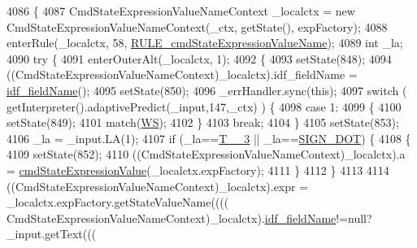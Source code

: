 \begin{DoxyCode}
4086                                                                                                            
                                   \{
4087     CmdStateExpressionValueNameContext \_localctx = \textcolor{keyword}{new} CmdStateExpressionValueNameContext(\_ctx, getState(),
       expFactory);
4088     enterRule(\_localctx, 58, \hyperlink{classgov_1_1nasa_1_1jpf_1_1inspector_1_1server_1_1expression_1_1parser_1_1_expression_grammar_parser_aa79865a7fa8f7e73f52ecb9ea357a1a4}{RULE\_cmdStateExpressionValueName});
4089     \textcolor{keywordtype}{int} \_la;
4090     \textcolor{keywordflow}{try} \{
4091       enterOuterAlt(\_localctx, 1);
4092       \{
4093       setState(848);
4094       ((CmdStateExpressionValueNameContext)\_localctx).idf\_fieldName = 
      \hyperlink{classgov_1_1nasa_1_1jpf_1_1inspector_1_1server_1_1expression_1_1parser_1_1_expression_grammar_parser_a6123d29ed4ca503a4952f04ea9e7a81f}{idf\_fieldName}();
4095       setState(850);
4096       \_errHandler.sync(\textcolor{keyword}{this});
4097       \textcolor{keywordflow}{switch} ( getInterpreter().adaptivePredict(\_input,147,\_ctx) ) \{
4098       \textcolor{keywordflow}{case} 1:
4099         \{
4100         setState(849);
4101         match(\hyperlink{classgov_1_1nasa_1_1jpf_1_1inspector_1_1server_1_1expression_1_1parser_1_1_expression_grammar_parser_ace44714ae633c7b14794cc5a24d9ebf3}{WS});
4102         \}
4103         \textcolor{keywordflow}{break};
4104       \}
4105       setState(853);
4106       \_la = \_input.LA(1);
4107       \textcolor{keywordflow}{if} (\_la==\hyperlink{classgov_1_1nasa_1_1jpf_1_1inspector_1_1server_1_1expression_1_1parser_1_1_expression_grammar_parser_a68f9589dcc3fc777455467ff010385ea}{T\_\_3} || \_la==\hyperlink{classgov_1_1nasa_1_1jpf_1_1inspector_1_1server_1_1expression_1_1parser_1_1_expression_grammar_parser_af578d1cac8553bcf6f52608a4e9125f1}{SIGN\_DOT}) \{
4108         \{
4109         setState(852);
4110         ((CmdStateExpressionValueNameContext)\_localctx).a = 
      \hyperlink{classgov_1_1nasa_1_1jpf_1_1inspector_1_1server_1_1expression_1_1parser_1_1_expression_grammar_parser_a9c38888905b31e514c2e4a695b8b2be6}{cmdStateExpressionValue}(\_localctx.expFactory);
4111         \}
4112       \}
4113 
4114        ((CmdStateExpressionValueNameContext)\_localctx).expr =  \_localctx.expFactory.getStateValueName((((
      CmdStateExpressionValueNameContext)\_localctx).\hyperlink{classgov_1_1nasa_1_1jpf_1_1inspector_1_1server_1_1expression_1_1parser_1_1_expression_grammar_parser_a6123d29ed4ca503a4952f04ea9e7a81f}{idf\_fieldName}!=null?\_input.getText(((

\end{DoxyCode}
